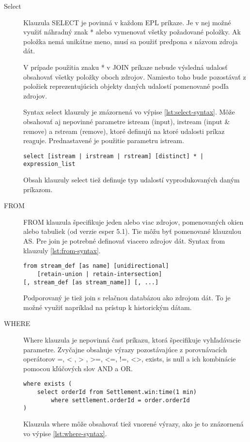 		\begin{description}
			\item[Select] Klauzula SELECT je povinná v každom EPL príkaze. Je v nej možné využiť náhradný znak * alebo vymenovať všetky požadované položky. Ak položka nemá unikátne meno, musí sa použiť predpona s názvom zdroja dát. 
			
			V prípade použitia znaku * v JOIN príkaze nebude výsledná udalosť obsahovať všetky položky oboch zdrojov. Namiesto toho bude pozostávať z položiek reprezentujúcich objekty daných udalostí pomenované podľa zdrojov.
			
			Syntax select klauzuly je znázornená vo výpise \ref{lst:select-syntax}. Môže obsahovať aj nepovinné parametre istream (input), irstream (input \& remove) a rstream (remove), ktoré definujú na ktoré udalosti príkaz reaguje. Prednastavené je použitie parametru istream.
			\begin{lstlisting}[label=lst:select-syntax,belowskip=-30pt]
select [istream | irstream | rstream] [distinct] * | expression_list
			\end{lstlisting}
			Obsah klauzuly select tiež definuje typ udalostí vyprodukovaných daným príkazom.
			
			\item[FROM] FROM klauzula špecifikuje jeden alebo viac zdrojov, pomenovaných okien alebo tabuliek (od verzie esper 5.1). Tie môžu byť pomenované klauzulou AS. Pre join je potrebné definovať viacero zdrojov dát. Syntax from klauzuly \ref{lst:from-syntax}.
			\begin{lstlisting}[label=lst:from-syntax]
from stream_def [as name] [unidirectional]
	[retain-union | retain-intersection] 
[, stream_def [as stream_name]] [, ...]
			\end{lstlisting}
			Podporovaný je tiež join s relačnou databázou ako zdrojom dát. To je možné využiť napríklad na prístup k historickým dátam.
			
			\item[WHERE] Where klauzula je nepovinná časť príkazu, ktorá špecifikuje vyhľadávacie parametre. Zvyčajne obsahuje výrazy pozostávajúce z porovnávacích operátorov =, < , > , >=, <=, !=, <>, exists, is null a ich kombinácie pomocou kľúčových slov AND a OR.
			\begin{lstlisting}[label=lst:where-syntax]
where exists (
	select orderId from Settlement.win:time(1 min) 
		where settlement.orderId = order.orderId
)
			\end{lstlisting}
			Klauzula where môže obsahovať tiež vnorené výrazy, ako je to znázornená vo výpise \ref{lst:where-syntax}.
			

\end{description}
